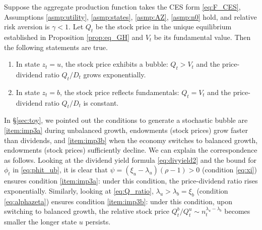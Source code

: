 \documentclass[a4paper,12pt]{article}
\numberwithin{equation}{section}
\theoremstyle{plain}
\begin{document}
\begin{thm}\label{thm:bubble_GH}
Suppose the aggregate production function takes the CES form \eqref{eq:F_CES}, Assumptions \ref{asmp:utility}, \ref{asmp:states}, \ref{asmp:AZ}, \ref{asmp:n0} hold, and relative risk aversion is $\gamma<1$. Let $Q_t$ be the stock price in the unique equilibrium established in Proposition \ref{prop:eq_GH} and $V_t$ be its fundamental value. Then the following statements are true.
\begin{enumerate}
    \item In state $z_t=u$, the stock price exhibits a bubble: $Q_t>V_t$ and the price-dividend ratio $Q_t/D_t$ grows exponentially.
    \item In state $z_t=b$, the stock price reflects fundamentals: $Q_t=V_t$ and the price-dividend ratio $Q_t/D_t$ is constant.
\end{enumerate}
\end{thm}

In \S\ref{sec:toy}, we pointed out the conditions to generate a stochastic bubble are \ref{item:imp3a} during unbalanced growth, endowments (stock prices) grow faster than dividends, and \ref{item:imp3b} when the economy switches to balanced growth, endowments (stock prices) sufficiently decline. We can explain the correspondence as follows. Looking at the dividend yield formula \eqref{eq:divyield2} and the bound for $\phi_t$ in \eqref{eq:phit_ub}, it is clear that $\psi=(\xi_u-\lambda_u)(\rho-1)>0$ (condition \eqref{eq:xi}) ensures condition \ref{item:imp3a}: under this condition, the price-dividend ratio rises exponentially. Similarly, looking at \eqref{eq:Q_ratio}, $\lambda_u>\lambda_b=\xi_b$ (condition \eqref{eq:alphazeta}) ensures condition \ref{item:imp3b}: under this condition, upon switching to balanced growth, the relative stock price $Q_t^b/Q_t^u\sim n_t^{\lambda_u-\lambda_b}$ becomes smaller the longer state $u$ persists.
\end{document}
